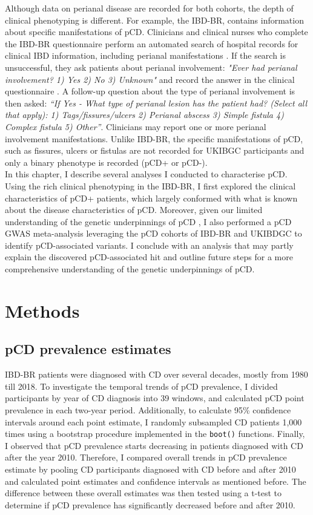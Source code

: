 Although data on perianal disease are recorded for both cohorts, the depth of clinical phenotyping is different. For example, the IBD-BR, contains information about specific manifestations of pCD. Clinicians and clinical nurses who complete the IBD-BR questionnaire perform an automated search of hospital records for clinical IBD information, including perianal manifestations \cite{ibdbr-protocol-v8}.  If the search is unsuccessful, they ask patients about perianal involvement: \textit{"Ever had perianal involvement? 1) Yes 2) No 3) Unknown"}  and record the answer in the clinical questionnaire \cite{ibdbr-questionnaire-v7}. A follow-up question about the type of perianal involvement is then asked: \textit{“If Yes - What type of perianal lesion has the patient had? (Select all that apply): 1) Tags/fissures/ulcers 2) Perianal abscess 3) Simple fistula 4) Complex fistula 5) Other”}. Clinicians may report one or more perianal involvement manifestations.  Unlike IBD-BR, the specific manifestations of pCD, such as fissures, ulcers or fistulas are not recorded for UKIBGC participants and only a binary phenotype is recorded (pCD+ or pCD-). \\

In this chapter, I describe several analyses I conducted to characterise pCD. Using the rich clinical phenotyping in the IBD-BR, I first explored the clinical characteristics of pCD+ patients, which largely conformed with what is known about the disease characteristics of pCD. Moreover, given our limited understanding of the genetic underpinnings of pCD \cite{Eglinton2012-ls,Latiano2009-bu,Tozer2009-mp,Akhlaghpour2023-jw,Kaur2016-bs}, I also performed a pCD GWAS meta-analysis leveraging the pCD cohorts of IBD-BR and UKIBDGC to identify pCD-associated variants. I conclude with an analysis that may partly explain the discovered pCD-associated hit and outline future steps for a more comprehensive understanding of the genetic underpinnings of pCD.
\section{Methods}
\subsection{pCD prevalence estimates}
IBD-BR patients were diagnosed with CD over several decades, mostly from 1980 till 2018. To investigate the temporal trends of pCD prevalence, I divided participants by year of CD diagnosis into 39 windows, and calculated pCD point prevalence in each two-year period. Additionally, to calculate 95\% confidence intervals around each point estimate, I randomly subsampled CD patients 1,000 times using a bootstrap procedure implemented in the \Verb+boot()+ functions. Finally, I observed that pCD prevalence starts decreasing in patients diagnosed with CD after the year 2010. Therefore, I compared overall trends in pCD prevalence estimate by pooling CD participants diagnosed with CD before and after 2010 and calculated point estimates and confidence intervals as mentioned before. The difference between these overall estimates was then tested using a t-test to determine if pCD prevalence has significantly decreased before and after 2010.
